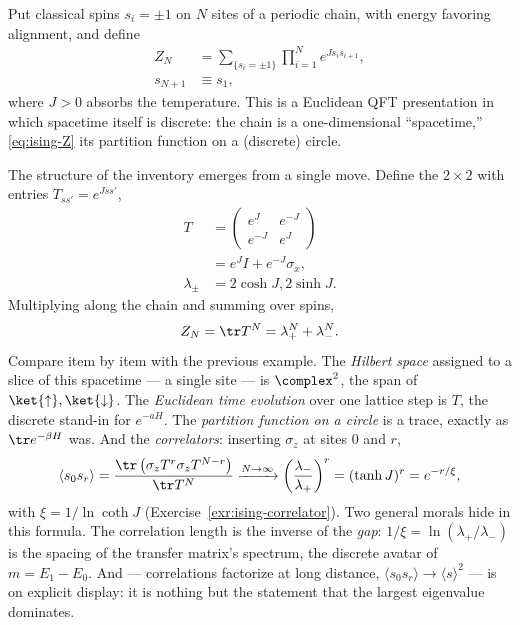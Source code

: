 \begin{eexample}
\label{ex:ising-chain}
Put classical spins $s_i = \pm 1$ on $N$ sites of a periodic chain, with energy
favoring alignment, and define
\begin{equation}
\begin{aligned}
Z_N &= \sum_{\{s_i = \pm 1\}} \prod_{i=1}^{N} e^{J s_i s_{i+1}},\\
s_{N+1} &\equiv s_1 ,
\end{aligned}
\label{eq:ising-Z}
\end{equation}
where $J > 0$ absorbs the temperature. This is a Euclidean QFT presentation in
which spacetime itself is discrete: the chain is a one-dimensional
``spacetime,'' \eqref{eq:ising-Z} its partition function on a (discrete) circle.

The structure of the inventory emerges from a single move. Define the $2\times
2$  with entries $T_{s s'} = e^{J s s'}$,
\begin{equation}
\begin{aligned}
T &= \begin{pmatrix} e^{J} & e^{-J} \\ e^{-J} & e^{J} \end{pmatrix}\\
&= e^{J}I + e^{-J} \sigma_x,\\
\lambda_\pm &= 2\cosh J, 2\sinh J .
\end{aligned}
\end{equation}
Multiplying along the chain and summing over spins,
\begin{equation}
Z_N = \tr T^N = \lambda_+^N + \lambda_-^N .
\label{eq:ising-trace}
\end{equation}
Compare item by item with the previous example. The \emph{Hilbert space}
assigned to a slice of this spacetime --- a single site --- is $\complex^2$, the
span of $\ket{\uparrow}, \ket{\downarrow}$. The \emph{Euclidean time evolution}
over one lattice step is $T$, the discrete stand-in for $e^{-aH}$. The
\emph{partition function on a circle} is a trace, exactly as $\tr e^{-\beta H}$
was. And the \emph{correlators}: inserting $\sigma_z$ at sites $0$ and $r$,
\begin{equation}
\langle s_0 s_r \rangle = \frac{\tr \left( \sigma_z T^{r} \sigma_z T^{N-r}
\right)}{\tr T^N}
\xrightarrow{N \to \infty}
\left(\frac{\lambda_-}{\lambda_+}\right)^{r} = (\tanh J)^r = e^{-r/\xi},
\label{eq:ising-correlator}
\end{equation}
with  $\xi = 1/\ln \coth J$
(Exercise~\ref{exr:ising-correlator}). Two general morals hide in this formula.
The correlation length is the inverse of the \emph{gap}: $1/\xi =
\ln(\lambda_+/\lambda_-)$ is the spacing of the transfer matrix's spectrum, the
discrete avatar of $m = E_1 - E_0$. And  ---
correlations factorize at long distance, $\langle s_0 s_r \rangle \to \langle s
\rangle^2$ --- is on explicit display: it is nothing but the statement that the
largest eigenvalue dominates.


\end{eexample}

